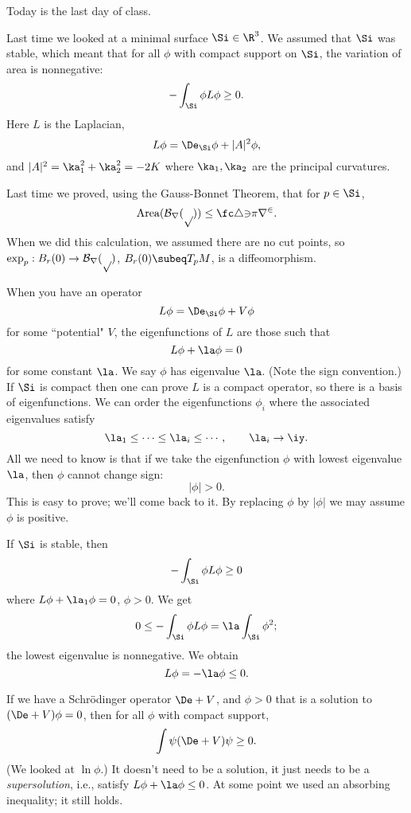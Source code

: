 
Today is the last day of class.

Last time we looked at a minimal surface $\Si\in \R^3$. We assumed that $\Si$ was stable, which meant that for all $\phi$ with compact support on $\Si$, the variation of area is nonnegative:
\[
-\int_{\Si} \phi L\phi\ge 0.
\]
Here $L$ is the Laplacian,
\[
L\phi = \De_{\Si} \phi+|A|^2\phi,
\]
and $|A|^2=\ka_1^2+\ka_2^2=-2K$ where $\ka_1,\ka_2$ are the principal curvatures. 

Last time we proved, using the Gauss-Bonnet Theorem, that for $p\in \Si$, 
\[
\text{Area}(\cal B_r(p))\le \fc 43 \pi r^2.
\]
When we did this calculation, we assumed there are no cut points, so $\exp_p:B_r(0)\to \cal B_r(p)$, $B_r(0)\subeq T_pM$, is a diffeomorphism.

When you have an operator 
\[
L\phi=\De_{\Si} \phi+V \phi
\]
for some ``potential" $V$, the eigenfunctions of $L$ are those such that 
\[
L\phi+\la\phi=0
\]
for some constant $\la$. We say $\phi$ has eigenvalue $\la$. (Note the sign convention.) If $\Si$ is compact %
then one can prove $L$ is a compact operator, so there is a basis of eigenfunctions. We can order the eigenfunctions $\phi_i$ where the associated eigenvalues satisfy
\[
\la_1\le \cdots \le \la_i\le \cdots,\qquad \la_i\to \iy.
\]
All we need to know is that if we take the eigenfunction $\phi$ with lowest eigenvalue $\la$, then $\phi$ cannot change sign:
\[
|\phi|>0.
\]
This is easy to prove; we'll come back to it. By replacing $\phi$ by $|\phi|$ we may assume $\phi$ is positive.

If $\Si$ is stable, then
\[
-\int_{\Si} \phi L\phi\ge 0
\]
where $L\phi +\la_1\phi=0$, $\phi>0$. We get 
\[
0\le -\int_{\Si}\phi L\phi=\la\int_{\Si}\phi^2;
\]
the lowest eigenvalue is nonnegative. We obtain
\[
L\phi=-\la\phi\le 0.
\]

If we have a Schr\"odinger operator $\De+V$, and $\phi>0$ that is a solution to $(\De+V)\phi=0$, then for all $\phi$ with compact support,
\[
\int \psi(\De+V)\psi\ge 0.
\]
(We looked at $\ln \phi$.) It doesn't need to be a solution, it just needs to be a {\it supersolution}, i.e., satisfy $L\phi+\la \phi\le 0$. 
At some point we used an absorbing inequality; it still holds.

